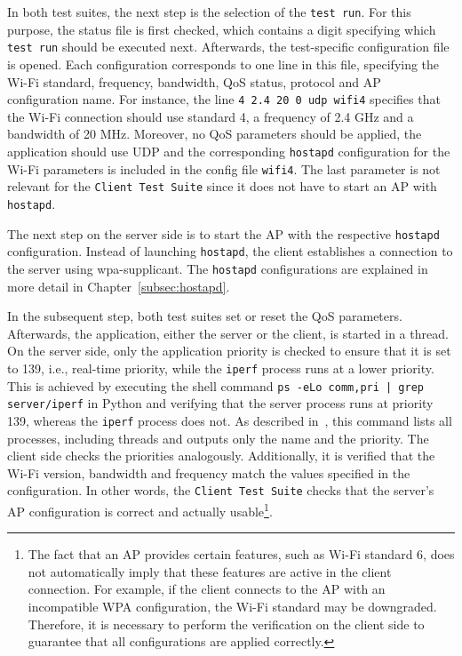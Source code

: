 In both test suites, the next step is the selection of the \texttt{test run}.  
For this purpose, the status file is first checked, which contains a digit specifying which \texttt{test run} should be executed next.  
Afterwards, the test-specific configuration file is opened.
Each configuration corresponds to one line in this file, specifying the Wi-Fi standard, frequency, bandwidth, \ac{QoS} status, protocol and \ac{AP} configuration name.  
For instance, the line \texttt{4 2.4 20 0 udp wifi4} specifies that the Wi-Fi connection should use standard 4, a frequency of 2.4 GHz and a bandwidth of 20 MHz.  
Moreover, no \ac{QoS} parameters should be applied, the application should use \ac{UDP} and the corresponding \texttt{hostapd} configuration for the Wi-Fi parameters is included in the config file \texttt{wifi4}.  
The last parameter is not relevant for the \texttt{Client Test Suite} since it does not have to start an \ac{AP} with \texttt{hostapd}.  

The next step on the server side is to start the \ac{AP} with the respective \texttt{hostapd} configuration.  
Instead of launching \texttt{hostapd}, the client establishes a connection to the server using wpa-supplicant.  
The \texttt{hostapd} configurations are explained in more detail in Chapter~\ref{subsec:hostapd}.  

In the subsequent step, both test suites set or reset the \ac{QoS} parameters.
Afterwards, the application, either the server or the client, is started in a thread.    
On the server side, only the application priority is checked to ensure that it is set to 139, i.e., real-time priority, while the \texttt{iperf} process runs at a lower priority.  
This is achieved by executing the shell command \texttt{ps -eLo comm,pri | grep server/iperf} in Python and verifying that the server process runs at priority 139, whereas the \texttt{iperf} process does not.  
As described in~\cite{ps}, this command lists all processes, including threads and outputs only the name and the priority.  
The client side checks the priorities analogously.  
Additionally, it is verified that the Wi-Fi version, bandwidth and frequency match the values specified in the configuration.  
In other words, the \texttt{Client Test Suite} checks that the server's \ac{AP} configuration is correct and actually usable\footnote{The fact that an \ac{AP} provides certain features, such as Wi-Fi standard 6, does not automatically imply that these features are active in the client connection.  
For example, if the client connects to the \ac{AP} with an incompatible \ac{WPA} configuration, the Wi-Fi standard may be downgraded.  
Therefore, it is necessary to perform the verification on the client side to guarantee that all configurations are applied correctly.}.  


